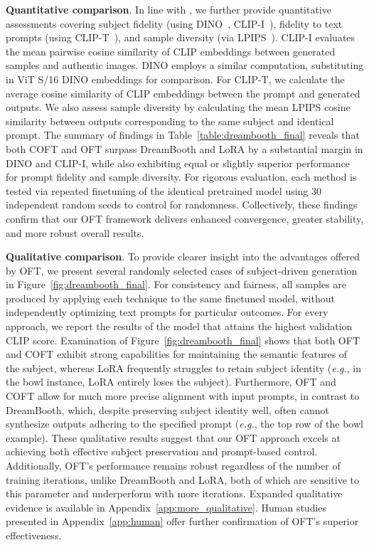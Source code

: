 \textbf{Quantitative comparison}. In line with \cite{ruiz2023dreambooth}, we further provide quantitative assessments covering subject fidelity (using DINO~\cite{caron2021emerging}, CLIP-I~\cite{radford2021learning}), fidelity to text prompts (using CLIP-T~\cite{radford2021learning}), and sample diversity (via LPIPS~\cite{zhang2018unreasonable}). CLIP-I evaluates the mean pairwise cosine similarity of CLIP embeddings between generated samples and authentic images. DINO employs a similar computation, substituting in ViT S/16 DINO embeddings for comparison. For CLIP-T, we calculate the average cosine similarity of CLIP embeddings between the prompt and generated outputs. We also assess sample diversity by calculating the mean LPIPS cosine similarity between outputs corresponding to the same subject and identical prompt. The summary of findings in Table~\ref{table:dreambooth_final} reveals that both COFT and OFT surpass DreamBooth and LoRA by a substantial margin in DINO and CLIP-I, while also exhibiting equal or slightly superior performance for prompt fidelity and sample diversity. For rigorous evaluation, each method is tested via repeated finetuning of the identical pretrained model using 30 independent random seeds to control for randomness. Collectively, these findings confirm that our OFT framework delivers enhanced convergence, greater stability, and more robust overall results.

\textbf{Qualitative comparison}. To provide clearer insight into the advantages offered by OFT, we present several randomly selected cases of subject-driven generation in Figure~\ref{fig:dreambooth_final}. For consistency and fairness, all samples are produced by applying each technique to the same finetuned model, without independently optimizing text prompts for particular outcomes. For every approach, we report the results of the model that attains the highest validation CLIP score. Examination of Figure~\ref{fig:dreambooth_final} shows that both OFT and COFT exhibit strong capabilities for maintaining the semantic features of the subject, whereas LoRA frequently struggles to retain subject identity (\emph{e.g.}, in the bowl instance, LoRA entirely loses the subject). Furthermore, OFT and COFT allow for much more precise alignment with input prompts, in contrast to DreamBooth, which, despite preserving subject identity well, often cannot synthesize outputs adhering to the specified prompt (\emph{e.g.}, the top row of the bowl example). These qualitative results suggest that our OFT approach excels at achieving both effective subject preservation and prompt-based control. Additionally, OFT's performance remains robust regardless of the number of training iterations, unlike DreamBooth and LoRA, both of which are sensitive to this parameter and underperform with more iterations. Expanded qualitative evidence is available in Appendix~\ref{app:more_qualitative}. Human studies presented in Appendix~\ref{app:human} offer further confirmation of OFT’s superior effectiveness.

